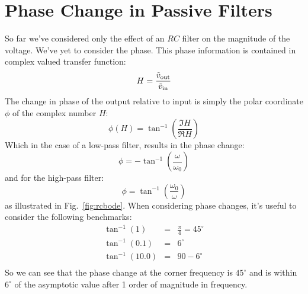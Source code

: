 \documentclass[12pt,oneside]{book}
\begin{document}
\section{Phase Change in Passive Filters}

So far we've considered only the effect of an $RC$ filter on the magnitude of the voltage.  We've yet to consider the phase.  This phase information is contained in complex valued transfer function:
\begin{displaymath}
H = \frac{\tilde{v}_{\rm out}}{\tilde{v}_{\rm in}} 
\end{displaymath}
The change in phase of the output relative to input is simply the polar coordinate $\phi$ of the complex number $H$:
\begin{displaymath}
\phi(H) = \tan^{-1}\left( \frac{\Im{H}}{\Re{H}}\right)
\end{displaymath}
Which in the case of a low-pass filter, results in the phase change:
\begin{displaymath}
\phi = -\tan^{-1} \left( \frac{\omega}{\omega_0}\right)
\end{displaymath}
and for the high-pass filter:
\begin{displaymath}
\phi = \tan^{-1} \left( \frac{\omega_0}{\omega}\right)
\end{displaymath}
as illustrated in Fig.~\ref{fig:rcbode}.  When considering phase changes, it's useful to consider the following benchmarks:
\begin{eqnarray*}
\tan^{-1}(1)  &=& \frac{\pi}{4} = 45^\circ\\
\tan^{-1}(0.1)  &=& 6^\circ\\
\tan^{-1}(10.0)  &=& 90 - 6^\circ\\
\end{eqnarray*}
So we can see that the phase change at the corner frequency is $45^\circ$ and is within $6^\circ$ of the asymptotic value after 1 order of magnitude in frequency.
\end{document}
